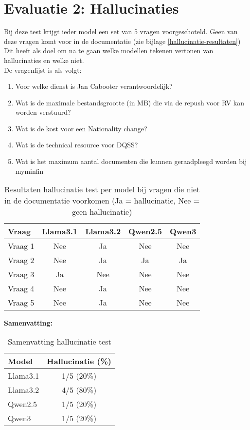 \section{Evaluatie 2: Hallucinaties}

Bij deze test krijgt ieder model een set van 5 vragen voorgeschoteld. Geen van deze vragen komt voor in de documentatie (zie bijlage \ref{hallucinatie-resultaten}) Dit heeft als doel om na te gaan welke modellen tekenen vertonen van hallucinaties en welke niet. 
\\[1em]
De vragenlijst is als volgt:

\begin{enumerate}
    \item Voor welke dienst is Jan Cabooter verantwoordelijk?
    \item Wat is de maximale bestandsgrootte (in MB) die via de repush voor RV kan worden verstuurd?
    \item Wat is de kost voor een Nationality change?
    \item Wat is de technical resource voor DQSS?
    \item Wat is het maximum aantal documenten die kunnen geraadpleegd worden bij myminfin
\end{enumerate}

\begin{table}[H]
    \begin{tabular}{|l|c|c|c|c|}
        \hline
        \textbf{Vraag} & \textbf{Llama3.1} & \textbf{Llama3.2} & \textbf{Qwen2.5} & \textbf{Qwen3} \\
        \hline
       Vraag 1 & Nee & Ja & Nee & Nee \\
       Vraag 2 & Nee & Ja & Ja & Ja \\
       Vraag 3 & Ja & Nee & Nee & Nee \\
       Vraag 4 & Nee & Ja & Nee & Nee \\
       Vraag 5 & Nee & Ja & Nee & Nee \\
        \hline
    \end{tabular}
    \caption{Resultaten hallucinatie test per model bij vragen die niet in de documentatie voorkomen (Ja = hallucinatie, Nee = geen hallucinatie)}
\end{table}

\noindent\textbf{Samenvatting:}  
\begin{table}[H]
    \begin{tabular}{|l|c|}
        \hline
        \textbf{Model} & \textbf{Hallucinatie (\%)} \\
        \hline
        Llama3.1 & 1/5 (20\%) \\
        Llama3.2 & 4/5 (80\%) \\
        Qwen2.5  & 1/5 (20\%) \\
        Qwen3    & 1/5 (20\%) \\
        \hline
    \end{tabular}
    \caption{Samenvatting hallucinatie test}
\end{table}


